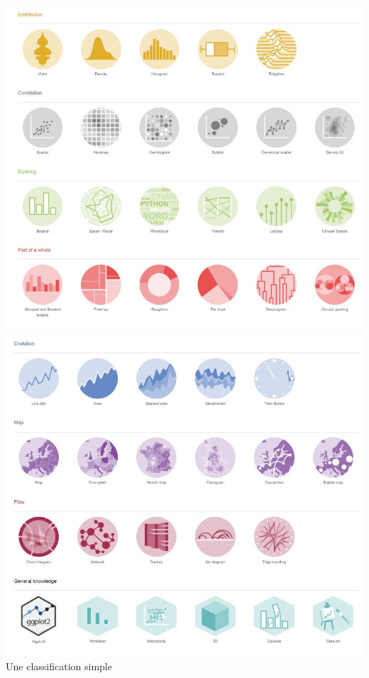 \documentclass[
]{book}
\begin{document}
\includegraphics{./Images/ggplotGallery1.jpg}
\includegraphics{./Images/ggplotGallery2.jpg}
Une classification simple
\end{document}

